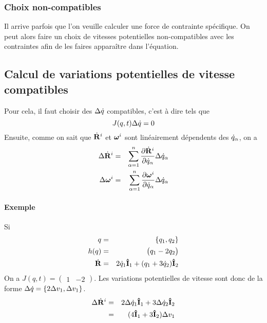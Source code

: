 \subsubsection{Choix non-compatibles}
Il arrive parfois que l'on veuille calculer une force de contrainte spécifique. On peut alors
faire un choix de vitesses potentielles non-compatibles avec les contraintes afin de les
faires apparaître dans l'équation.

\subsection{Calcul de variations potentielles de vitesse compatibles}
Pour cela, il faut choisir des $\Delta \dot{q}$ compatibles, c'est à dire tels que
\[ J(q, t) \Delta \dot{q} = 0 \]
Ensuite,
comme on sait que $\dot{\bf R}^i$ et ${\bm \omega}^i$
sont linéairement dépendents des $\dot{q}_\alpha$, on a
\begin{eqnarray*}
  \Delta \dot{\bf R}^i &=& \sum_{\alpha = 1}^n \frac{\partial \dot{\bf R}^i}{\partial \dot{q}_\alpha} \Delta \dot{q}_\alpha\\
  \Delta {\bm \omega}^i &=& \sum_{\alpha = 1}^n \frac{\partial {\bm \omega}^i}{\partial \dot{q}_\alpha} \Delta \dot{q}_\alpha
\end{eqnarray*}

\paragraph{Exemple}
Si
\begin{eqnarray*}
  q &=& \{q_1, q_2\}\\
h(q) &=& \begin{pmatrix}q_1 - 2q_2\end{pmatrix}\\
  \dot{\bf R} &=& 2\dot{q}_1 {\bf\hat{I}}_1 + (q_1 + 3\dot{q}_2) {\bf\hat{I}}_2
\end{eqnarray*}
On a $J(q, t) = \begin{pmatrix}1 & -2\end{pmatrix}$.
Les variations potentielles de vitesse sont donc de la forme $\Delta \dot{q} = \{2\Delta v_1, \Delta v_1\}$.
\begin{eqnarray*}
  \Delta \dot{\bf R}^i &=& 2 \Delta \dot{q}_1 {\bf\hat{I}}_1 + 3 \Delta \dot{q}_2 {\bf\hat{I}}_2\\
                &=& (4{\bf\hat{I}}_1 + 3{\bf\hat{I}}_2) \Delta v_1
\end{eqnarray*}


